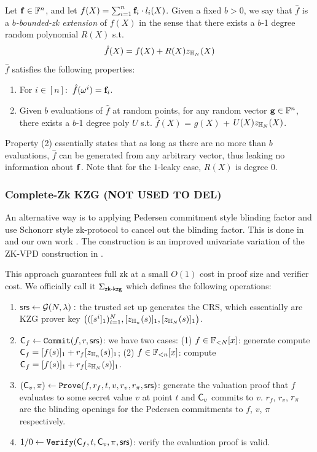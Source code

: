 \begin{lemma} Let ${{\mathbf {f}}} \in \mathbb{F}^n$, and let 
$f(X) = \sum_{i=1}^n {{\mathbf {f}}}_i \cdot l_i(X)$.
Given a fixed $b>0$, we say that $\hat{f}$
is a {\em $b$-bounded-zk extension} of $f(X)$ 
in the sense that there exists a $b$-1 degree
random polynomial $R(X)$ s.t.
\[
	\hat{f}(X) = f(X) + R(X) z_{{\mathbb{H}_{N}}}(X)
\]
$\hat{f}$ satisfies the following properties:
\begin{enumerate}
	\item For $i\in [n]:$ $\hat{f}(\omega^i) = {{\mathbf {f}}}_i$.
	\item Given $b$ evaluations of $\hat{f}$ at random points,
		for any random vector ${{\mathbf {g}}} \in \mathbb{F}^n$,
		there exists a $b$-1 degree poly $U$ s.t.
		$\hat{f}(X)$ = $g(X)$ + $U(X) z_{{\mathbb{H}_{N}}}(X)$.
\end{enumerate}
\end{lemma}

Property (2) essentially states that as long as there are no more than
$b$ evaluations, $\hat{f}$ can be generated from any arbitrary
vector, thus leaking no information about ${{\mathbf {f}}}$.
Note that for the $1$-leaky case, $R(X)$ is degree $0$.

\subsubsection{Complete-Zk KZG (NOT USED TO DEL)}
An alternative way is to applying Pedersen commitment style blinding
factor and use Schonorr style zk-protocol to cancel out the blinding
factor. This is done in \cite{binacc22} and our own work
.  The  construction is an improved  univariate
variation of the ZK-VPD construction in \cite{zkvsql}.

This approach guarantees full zk at a small $O(1)$
cost in proof size and verifier cost. We officially call
it ${\Sigma_{{\textsf{zk-kzg}}}}$ which defines the following operations:
\begin{enumerate}
	\item $\mathsf{srs} \leftarrow {\mathcal G}(N, \lambda):$ the trusted
		set up generates the CRS, which essentially
		are KZG prover key
		$\left( ([s^i]_1)_{i=1}^N, [z_{\mathbb{H}_{n}}(s)]_1, [z_{\mathbb{H}_{N}}(s)]_1 \right)$.
	\item ${\mathsf{C}}_f \leftarrow \texttt{Commit}(f, r, \mathsf{srs})$: 
		we have two cases: (1) $f\in \mathbb{F}_{<N}[x]$: generate
		compute ${\mathsf{C}}_f = [f(s)]_1 + r_f[z_{\mathbb{H}_{n}}(s)]_1$;
		(2) $f\in \mathbb{F}_{<n}[x]$: compute
		${\mathsf{C}}_f = [f(s)]_1 + r_f[z_{\mathbb{H}_{N}}(s)]_1$.

	\item $({\mathsf{C}}_v, \pi) \leftarrow \texttt{Prove}(f, r_f, t, v, r_v, r_\pi, 
		\mathsf{srs})$:
		generate the valuation proof that $f$ evaluates to some secret
		value $v$ at point $t$ and ${\mathsf{C}}_v$ commits to $v$.
		$r_f$, $r_v$, $r_\pi$ are the blinding openings for the
		Pedersen commitments to $f$, $v$, $\pi$ respectively.
	\item $1/0 \leftarrow \texttt{Verify}({\mathsf{C}}_f, t, {\mathsf{C}}_v, \pi, \mathsf{srs})$:
		verify the evaluation proof is valid.
\end{enumerate} 

